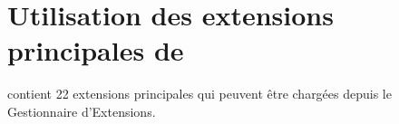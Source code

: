 
\chapter{Utilisation des extensions principales de \qg}\label{sec:core_plugins}



\qg \CURRENT contient 22 extensions principales qui peuvent être chargées depuis
le Gestionnaire d'Extensions.


